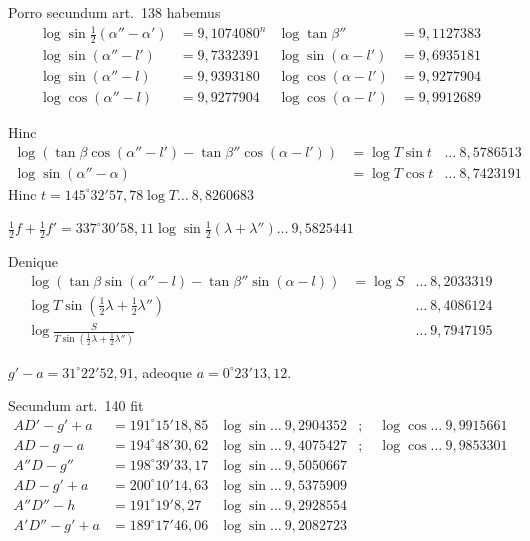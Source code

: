 \documentclass[12pt,a4paper]{article}
\begin{document}
Porro secundum art.~138 habemus
\begin{align*}
\log\sin\tfrac{1}{2}(\alpha'' - \alpha') &= 9,1074080^n & \log\tan\beta'' &= 9,1127383\\
\log\sin(\alpha'' - l') &= 9,7332391 & \log\sin(\alpha - l') &= 9,6935181\\
\log\sin(\alpha'' - l) &= 9,9393180 & \log\cos(\alpha - l') &= 9,9277904\\
\log\cos(\alpha'' - l) &= 9,9277904 & \log\cos(\alpha - l') &= 9,9912689
\end{align*}

Hinc
\begin{align*}
\log(\tan\beta \cos(\alpha'' - l') - \tan\beta'' \cos(\alpha - l')) &= \log T\sin t & \ldots\ 8,5786513\\
\log\sin(\alpha'' - \alpha) &= \log T\cos t & \ldots\ 8,7423191
\end{align*}
Hinc $t = 145^\circ32'57,78$\quad $\log T \ldots\ 8,8260683$

$\tfrac{1}{2}f + \tfrac{1}{2}f' = 337^\circ30'58,11$\quad $\log\sin\tfrac{1}{2}(\lambda + \lambda'') \ldots\ 9,5825441$

Denique
\begin{align*}
\log(\tan\beta\sin(\alpha'' - l) - \tan\beta''\sin(\alpha - l)) &= \log S & \ldots\ 8,2033319\\
\log T\sin(\tfrac{1}{2}\lambda + \tfrac{1}{2}\lambda'') & & \ldots\ 8,4086124\\
\log\tfrac{S}{T\sin(\frac{1}{2}\lambda + \frac{1}{2}\lambda'')} & & \ldots\ 9,7947195
\end{align*}

$g' - a = 31^\circ22'52,91$, adeoque $a = 0^\circ23'13,12$.

Secundum art.~140 fit
\begin{align*}
AD' - g' + a &= 191^\circ15'18,85 & \log\sin \ldots\ 9,2904352 &;\quad \log\cos \ldots\ 9,9915661\\
AD - g - a &= 194^\circ48'30,62 & \log\sin \ldots\ 9,4075427 &;\quad \log\cos \ldots\ 9,9853301\\
A''D - g'' &= 198^\circ39'33,17 & \log\sin \ldots\ 9,5050667 &\\
AD - g' + a &= 200^\circ10'14,63 & \log\sin \ldots\ 9,5375909 &\\
A''D'' - h &= 191^\circ19'8,27 & \log\sin \ldots\ 9,2928554 &\\
A'D'' - g' + a &= 189^\circ17'46,06 & \log\sin \ldots\ 9,2082723 &
\end{align*}
\end{document}
